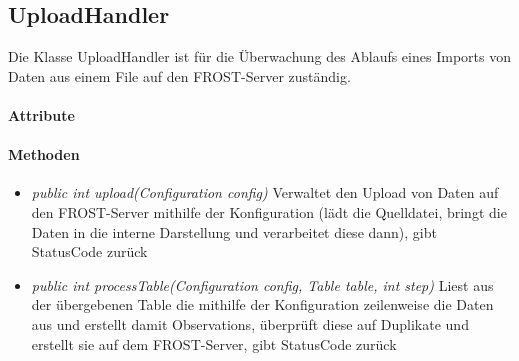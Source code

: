 \subsection{UploadHandler}
Die Klasse UploadHandler ist für die Überwachung des Ablaufs eines Imports von Daten aus einem File auf den FROST-Server zuständig.

\paragraph{Attribute}
\paragraph{Methoden}
\begin{itemize}
\item \textit{public int upload(Configuration config)} Verwaltet den Upload von Daten auf den FROST-Server mithilfe der Konfiguration (lädt die Quelldatei, bringt die Daten in die interne Darstellung und verarbeitet diese dann), gibt StatusCode zurück
\item \textit{public int processTable(Configuration config, Table table, int step)} Liest aus der übergebenen Table die mithilfe der Konfiguration zeilenweise die Daten aus und erstellt damit Observations, überprüft diese auf Duplikate und erstellt sie auf dem FROST-Server, gibt StatusCode zurück
\end{itemize}
